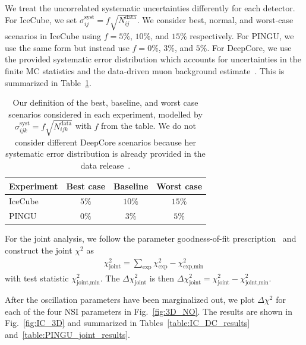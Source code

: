 We treat the uncorrelated systematic uncertainties differently for each detector. For IceCube, we set $\sigma_{ij}^\text{syst} = f\sqrt{N_{ij}^\text{data}}$.
We consider best, normal, and worst-case scenarios in IceCube using
$f=5\%$, $10\%$, and $15\%$ respectively. For PINGU, we use the same form but instead use $f=0\%$, $3\%$, and $5\%$.
For DeepCore, we use the provided systematic error distribution which accounts for uncertainties in the finite MC statistics and the data-driven 
muon background estimate~\cite{DC2019data}. This is summarized in Table~\ref{table:syst_errors}.
{\renewcommand{\arraystretch}{1.2}
\begin{table}
   \centering
   \begin{tabular}{lccc}
      \hline \hline
      Experiment & Best case & Baseline & Worst case \\
      \hline
      IceCube & $5\%$ & $10\%$ & $15\%$ \\
      PINGU & $0\%$ & $3\%$ & $5\%$ \\
      \hline \hline
   \end{tabular}
   \caption{Our definition of the best, baseline, and worst case scenarios considered in each experiment, modelled by $\sigma_{ijk}^\text{syst} = f\sqrt{N_{ijk}^\text{data}}$ with $f$ from the table.
   We do not consider different DeepCore scenarios because her systematic error distribution is already provided in the data release~\cite{DC2019data}.}\label{table:syst_errors}
\end{table}

For the joint analysis, we follow the parameter goodness-of-fit prescription~\cite{maltoni2003} and construct the joint $\chi^2$ as 
\begin{align}\label{eq:joint_chisq}
    \chi^2_\text{joint} = \sum_\text{exp}\chi^2_\text{exp} - \chi^2_\text{exp,min}\,
\end{align}
with test statistic $\chi^2_\text{joint,min}$. The $\Delta \chi^2_\text{joint}$ is then $\Delta \chi^2_\text{joint} = \chi^2_\text{joint} - \chi^2_\text{joint,min}$.

After the oscillation parameters have been marginalized out, we plot $\Delta \chi^2$ for each of the four NSI parameters in Fig.~\ref{fig:3D_NO}. 
The results are shown in Fig.~\ref{fig:IC_3D} and summarized in Tables~\ref{table:IC_DC_results} and~\ref{table:PINGU_joint_results}.

}
